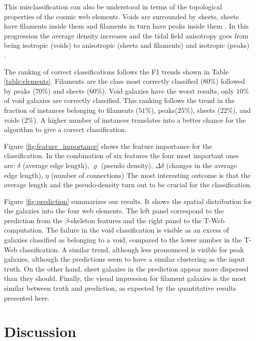 \documentclass[usenatbib]{mnras}
\begin{document}
This misclassification can also be understood in terms of the
topological properties of the cosmic web elements. 
Voids are surrounded by sheets, sheets have filaments inside them and
filaments in turn have peaks inside them \citep{Cautun2014}. 
In this progression the average density increases and the tidal field
anisotropy goes from being isotropic (voids) to anisotropic (sheets
and filaments) and isotropic (peaks) \citep{Bustamante2015}.

The ranking of correct classifications follows the F1 trends
shown in Table \ref{table:elements}.
Filaments are the class most correctly classified ($80\%$) followed by
peaks ($70\%$) and sheets ($60\%$).
Void galaxies have the worst results, only $10\%$ of void galaxies are
correctly classified.
This ranking follows the trend in the fraction of instances belonging to
filaments ($51\%$), peaks($25\%$), sheets ($22\%$), and voids ($2\%$).
A higher number of instances translates into a better chance for the
algorithm to give a correct classification. 

Figure \ref{fig:feature_importance} shows the feature
importance for the classification.
In the combination of six features the four most important ones are:
$\delta$ (average edge
length), $\varrho$ (pseudo density), $\Delta \delta$ (changes in the average edge length), $\eta$ (number of connections) 
The most interesting outcome is that the average length and the pseudo-density turn out to be crucial for the classification.

Figure \ref{fig:prediction} summarizes our results.
It shows the spatial distribution for the galaxies into the four web
elements. 
The left panel correspond to the prediction from the
$\beta$-skeleton features and the right panel to the T-Web
computation.
The failure in the void classification is visible as an excess of
galaxies classified as belonging to a void, compared to the lower
number in the T-Web classification.
A similar trend, although less pronounced is visible for peak
galaxies, although the predictions seem to have a similar clustering
as the input truth. 
On the other hand, sheet galaxies in the prediction appear more
dispersed than they should.
Finally, the visual impression for filament galaxies is the most
similar between truth and prediction, as expected by the quantitative
results presented here.


\section{Discussion}\label{sec:discussion}
\end{document}
